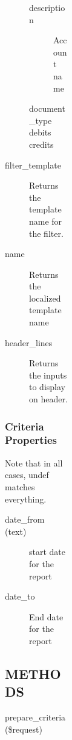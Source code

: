 \begin{description}
\begin{description}
\begin{description}
\begin{description}
\begin{description}
\begin{description}
\begin{description}
\begin{description}
\begin{description}
\begin{description}
\begin{description}
\begin{description}
\item[{description}] \mbox{}

Account name


\item[{document\_type}] \mbox{}
\item[{debits}] \mbox{}
\item[{credits}] \mbox{}\end{description}

\item[{filter\_template}] \mbox{}

Returns the template name for the filter.


\item[{name}] \mbox{}

Returns the localized template name


\item[{header\_lines}] \mbox{}

Returns the inputs to display on header.

\end{description}
\subsubsection*{Criteria Properties\label{LedgerSMB::DBObject::Report::co::Balance_y_Mayor_Criteria_Properties}}


Note that in all cases, undef matches everything.

\begin{description}

\item[{date\_from (text)}] \mbox{}

start date for the report


\item[{date\_to}] \mbox{}

End date for the report

\end{description}
\subsection*{METHODS\label{LedgerSMB::DBObject::Report::co::Balance_y_Mayor_METHODS}}
\begin{description}

\item[{prepare\_criteria(\$request)}] \mbox{}


\end{description}
\end{description}
\end{description}
\end{description}
\end{description}
\end{description}
\end{description}
\end{description}
\end{description}
\end{description}
\end{description}

